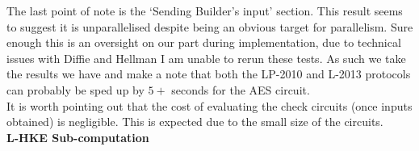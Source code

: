 \documentclass[ %
                    author={Nicholas Tutte},
                supervisor={Prof. Nigel Smart},
                    degree={MEng},
                     title={Secure Two Party Computation},
                  subtitle={A practical comparison of recent protocols},
                      type={Research - GG1K},
                      year={2015} ]{dissertation}
\begin{document}
					The last point of note is the `Sending Builder's input' section. This result seems to suggest it is unparallelised despite being an obvious target for parallelism. Sure enough this is an oversight on our part during implementation, due to technical issues with Diffie and Hellman I am unable to rerun these tests. As such we take the results we have and make a note that both the LP-2010 and L-2013 protocols can probably be sped up by $5+$ seconds for the AES circuit.\\

					It is worth pointing out that the cost of evaluating the check circuits (once inputs obtained) is negligible. This is expected due to the small size of the circuits.\\

					\FloatBarrier
					\noindent \textbf{L-HKE Sub-computation}\\
\end{document}
